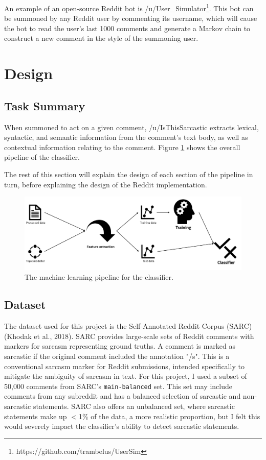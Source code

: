 \documentclass[a4paper,12pt]{article}
\let\stdsection\section
\renewcommand\section{\newpage\stdsection}
\begin{document}
An example of an open-source Reddit bot is /u/User\_Simulator\footnote{https://github.com/trambelus/UserSim}. This bot can be summoned by any Reddit user by commenting its username, which will cause the bot to read the user's last 1000 comments and generate a Markov chain to construct a new comment in the style of the summoning user.

\section{Design}
\subsection{Task Summary}
When summoned to act on a given comment, /u/IsThisSarcastic extracts lexical, syntactic, and semantic information from the comment's text body, as well as contextual information relating to the comment. Figure \ref{fig:cmd1} shows the overall pipeline of the classifier.

The rest of this section will explain the design of each section of the pipeline in turn, before explaining the design of the Reddit implementation.

\begin{figure}[h!]
\includegraphics[width=\linewidth]{Figures/pipeline.png}
\caption{The machine learning pipeline for the classifier.}
\label{fig:cmd1}
\end{figure}

\subsection{Dataset}
The dataset used for this project is the Self-Annotated Reddit Corpus (SARC) (Khodak et al., 2018). SARC provides large-scale sets of Reddit comments with markers for sarcasm representing ground truths. A comment is marked as sarcastic if the original comment included the annotation "/s". This is a conventional sarcasm marker for Reddit submissions, intended specifically to mitigate the ambiguity of sarcasm in text. For this project, I used a subset of 50,000 comments from SARC's \texttt{main-balanced} set. This set may include comments from any subreddit and has a balanced selection of sarcastic and non-sarcastic statements. SARC also offers an unbalanced set, where sarcastic statements make up $<$1\% of the data, a more realistic proportion, but I felt this would severely impact the classifier's ability to detect sarcastic statements.
\newpage
\end{document}
